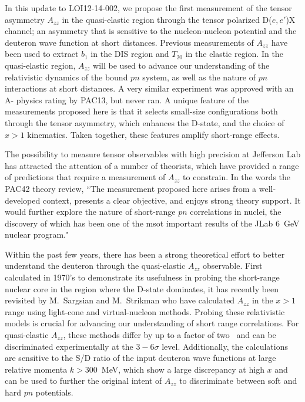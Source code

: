 In this update to LOI12-14-002, we propose the first measurement of the tensor asymmetry $A_{zz}$ in the quasi-elastic region through the tensor polarized D($e,e'$)X channel; an asymmetry that is sensitive to the nucleon-nucleon potential and the deuteron wave function at short distances.  Previous measurements of $A_{zz}$ have been used to extract $b_1$ in the DIS region and $T_{20}$ in the elastic region. In the quasi-elastic region, $A_{zz}$ will be used to advance our understanding of the relativistic dynamics of the bound $pn$ system, as well as the nature of $pn$ interactions at short distances. A very similar experiment was approved with an A- physics rating by PAC13, but never ran. A unique feature of the measurements proposed here is that it selects small-size configurations both through the tensor asymmetry, which enhances the D-state, and the choice of $x>1$ kinematics. Taken together, these features amplify short-range effects. 

The possibility to measure tensor observables with high precision at Jefferson Lab has attracted the attention of a number of theorists, which have provided a range of predictions that require a measurement of $A_{zz}$ to constrain. 
In the words the PAC42 theory review, ``The measurement proposed here arises from a well-developed context, presents a clear objective, and enjoys strong theory support. It would further explore the nature of short-range $pn$ correlations in nuclei, the discovery of which has been one of the msot important results of the JLab 6~GeV nuclear program."


Within the past few years, there has been a strong theoretical effort to better understand the deuteron through the quasi-elastic $A_{zz}$ observable. First calculated in 1970's to demonstrate its usefulness in probing the short-range nuclear core in the region where the D-state dominates, it has recently been revisited by
M.~Sargsian and M.~Strikman who have calculated $A_{zz}$ in the $x > 1$ range using light-cone and virtual-nucleon methods. Probing these relativistic models is crucial for advancing our understanding of short range correlations. For quasi-elastic $A_{zz}$, these methods differ by up to a factor of two~\cite{MISAK} and can be discriminated experimentally at the $3-6\sigma$ level. Additionally, the calculations are sensitive to the S/D ratio of the input deuteron wave functions at large relative momenta $k>300$~MeV, which show a large discrepancy at high $x$ and can be used to further the original intent of $A_{zz}$ to discriminate between soft and hard $pn$ potentials. 


